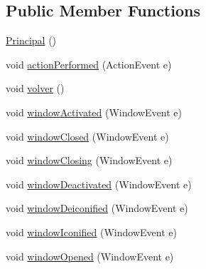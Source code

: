 \subsection*{Public Member Functions}
\begin{DoxyCompactItemize}
\item 
\mbox{\hyperlink{classvistas_1_1_principal_acf014fac1f15c33d980e722fe1e6d58f}{Principal}} ()
\item 
void \mbox{\hyperlink{classvistas_1_1_principal_a8371dc6a7768c2ec5afae9d2b266b139}{action\+Performed}} (Action\+Event e)
\item 
void \mbox{\hyperlink{classvistas_1_1_principal_ae8d4c8bb777f2af665a09be522ab1d81}{volver}} ()
\item 
void \mbox{\hyperlink{classvistas_1_1_principal_ade8818ac65f00c97240312f078fec2b0}{window\+Activated}} (Window\+Event e)
\item 
void \mbox{\hyperlink{classvistas_1_1_principal_a295e5c1a87bcd4b888c76aa346aaff12}{window\+Closed}} (Window\+Event e)
\item 
void \mbox{\hyperlink{classvistas_1_1_principal_a03d69d2a4a326d8d8d38434760faec6b}{window\+Closing}} (Window\+Event e)
\item 
void \mbox{\hyperlink{classvistas_1_1_principal_af96847312824430497ac7d76172f225f}{window\+Deactivated}} (Window\+Event e)
\item 
void \mbox{\hyperlink{classvistas_1_1_principal_aa086518578aefe569dc44287436df8d7}{window\+Deiconified}} (Window\+Event e)
\item 
void \mbox{\hyperlink{classvistas_1_1_principal_a2b6ea36288842cb398771591cc7b7b92}{window\+Iconified}} (Window\+Event e)
\item 
void \mbox{\hyperlink{classvistas_1_1_principal_adad5c3a92bd295ce50b2f66aceaa8524}{window\+Opened}} (Window\+Event e)
\end{DoxyCompactItemize}
